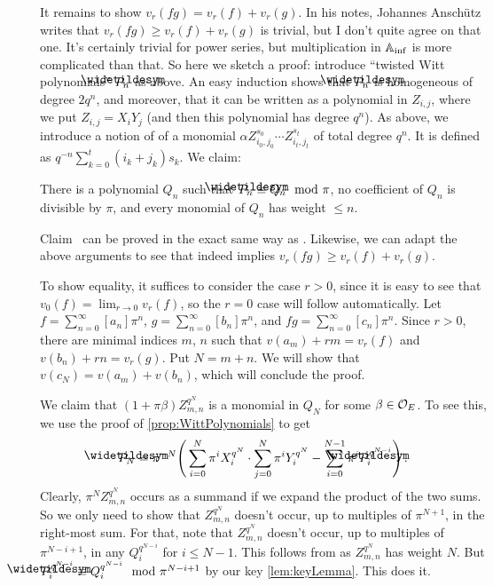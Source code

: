 \documentclass[a4paper, 10pt, oneside, DIV=9, chapterprefix=true, numbers=enddot,bibliography=totoc]{scrbook}
\begin{document}
\begin{proof*}
	It remains to show $v_r(fg)=v_r(f)+v_r(g)$. In his notes, Johannes Anschütz writes that $v_r(fg)\geq v_r(f)+v_r(g)$ is trivial, but I don't quite agree on that one. It's certainly trivial for power series, but multiplication in $\mathbb{A}_{\mathrm{inf}}$ is more complicated than that. So here we sketch a proof: introduce \enquote{twisted Witt polynomials} $\snake{P}_n$ as above. An easy induction shows that $\snake{P}_n$ is homogeneous of degree $2q^n$, and moreover, that it can be written as a polynomial in $Z_{i,j}$, where we put $Z_{i,j}=X_iY_j$ (and then this polynomial has degree $q^n$). As above, we introduce a notion of  of a monomial $\alpha Z_{i_0,j_0}^{s_0}\dotsm Z_{i_t,j_t}^{s_t}$ of total degree $q^n$. It is defined as $q^{-n}\sum_{k=0}^t(i_k+j_k)s_k$. We claim:
	\begin{alphanumerate}
		\item[\itememph{\boxtimes}] There is a polynomial $Q_n$ such that $\snake{P}_n\equiv Q_n\mod \pi$, no coefficient of $Q_n$ is divisible by $\pi$, and every monomial of $Q_n$ has weight $\leq n$.
	\end{alphanumerate}
	Claim~\itememph{\boxtimes} can be proved in the exact same way as \itememph{*}. Likewise, we can adapt the above arguments to see that \itememph{\boxtimes} indeed implies $v_r(fg)\geq v_r(f)+v_r(g)$.
	
	To show equality, it suffices to consider the case $r>0$, since it is easy to see that $v_0(f)=\lim_{r\to 0}v_r(f)$, so the $r=0$ case will follow automatically. Let $f=\sum_{n=0}^\infty [a_n]\pi^n$, $g=\sum_{n=0}^\infty [b_n]\pi^n$, and $fg=\sum_{n=0}^\infty[c_n]\pi^n$. Since $r>0$, there are minimal indices $m$, $n$ such that $v(a_m)+rm=v_r(f)$ and $v(b_n)+rn=v_r(g)$. Put $N=m+n$. We will show that $v(c_N)=v(a_m)+v(b_n)$, which will conclude the proof. 
	
	We claim that $(1+\pi \beta)Z_{m,n}^{q^N}$ is a monomial in $Q_N$ for some $\beta\in\mathcal{O}_E$. To see this, we use the proof of \cref{prop:WittPolynomials} to get
	\begin{equation*}
		\snake{P}_N=\pi^{-N}\Bigg(\sum_{i=0}^N\pi^iX_i^{q^N}\cdot \sum_{j=0}^N\pi^iY_i^{q^N}-\sum_{i=0}^{N-1}\pi^i\snake{P}_i^{q^{N-i}}\Bigg)\,.
	\end{equation*}
	Clearly, $\pi^NZ_{m,n}^{q^N}$ occurs as a summand if we expand the product of the two sums. So we only need to show that $Z_{m,n}^{q^N}$ doesn't occur, up to multiples of $\pi^{N+1}$, in the right-most sum. For that, note that $Z_{m,n}^{q^N}$ doesn't occur, up to multiples of $\pi^{N-i+1}$, in any $Q_i^{q^{N-i}}$ for $i\leq N-1$. This follows from \itememph{\boxtimes} as $Z_{m,n}^{q^N}$ has weight $N$. But $\snake{P}_i^{q^{N-i}}\equiv Q_i^{q^{N-i}}\mod \pi^{N-i+1}$ by our key \cref{lem:keyLemma}. This does it.
	

\end{proof*}
\end{document}

